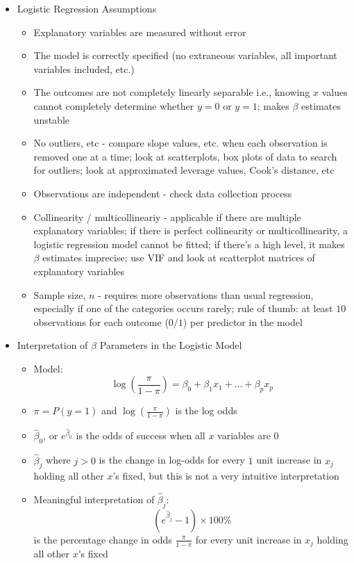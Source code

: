 \documentclass[12pt]{article}
\begin{document}
\begin{itemize}
\begin{itemize}
\begin{itemize}
\end{itemize} \end{itemize}
\item Logistic Regression Assumptions \begin{itemize} 
\item Explanatory variables are measured without error 
\item The model is correctly specified (no extraneous variables, all important variables included, etc.)
\item The outcomes are not completely linearly separable i.e., knowing $x$ values cannot completely determine whether $y = 0$ or $y=1$; makes $\beta$ estimates unstable 
\item No outliers, etc - compare slope values, etc. when each observation is removed one at a time; look at scatterplots, box plots of data to search for outliers; look at approximated leverage values, Cook's distance, etc 
\item Observations are independent - check data collection process 
\item Collinearity / multicollineariy - applicable if there are multiple explanatory variables; if there is perfect collinearity or multicollinearity, a logistic regression model cannot be fitted; if there's a high level, it makes $\beta$ estimates imprecise; use VIF and look at scatterplot matrices of explanatory variables 
\item Sample size, $n$ - requires more observations than usual regression, especially if one of the categories occurs rarely; rule of thumb: at least $10$ observations for each outcome ($0/1$) per predictor in the model \end{itemize} 
\item Interpretation of $\beta$ Parameters in the Logistic Model \begin{itemize} 
\item Model: $$ \log \left( \frac{\pi}{1-\pi} \right) = \beta_0 + \beta_1x_1 + \dots + \beta_px_p $$ 
\item $\pi = P(y=1)$ and $\log\left( \frac{\pi}{1-\pi} \right) $ is the log odds 
\item $\hat{\beta}_0$, or $e^{\hat{\beta}_0}$ is the odds of success when all $x$ variables are $0$ 
\item $\hat{\beta}_j$ where $j > 0$ is the change in log-odds for every $1$ unit increase in $x_j$ holding all other $x$'s fixed, but this is not a very intuitive interpretation 
\item Meaningful interpretation of $\hat{\beta}_j$: $$ (e^{\hat{\beta}_j} - 1) \times 100\%$$ is the percentage change in odds $\frac{\pi}{1-\pi}$ for every unit increase in $x_j$ holding all other $x$'s fixed \end{itemize} 

\end{itemize}
\end{document}
